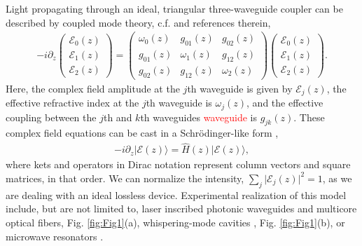 \documentclass[9pt,twocolumn,twoside]{osajnl}
\begin{document}
Light propagating through an ideal, triangular three-waveguide coupler can be described by coupled mode theory, c.f. \cite{RodriguezLara2015p068014} and references therein,
\begin{eqnarray} \label{eq:CMT}
-i \partial_{z} \left( \begin{array}{c} \mathcal{E}_{0}(z) \\ \mathcal{E}_{1}(z) \\  \mathcal{E}_{2}(z) \end{array} \right) =  \left( \begin{array}{ccc} 
\omega_{0}(z)  & g_{01}(z) & g_{02}(z) \\
g_{01}(z) & \omega_{1}(z) & g_{12}(z) \\
g_{02}(z) & g_{12}(z) & \omega_{2}(z)
\end{array} \right) \left( \begin{array}{c} \mathcal{E}_{0}(z) \\ \mathcal{E}_{1}(z) \\  \mathcal{E}_{2}(z) \end{array} \right).
\end{eqnarray}
Here, the complex field amplitude at the $j$th waveguide is given by $\mathcal{E}_{j}(z)$, the effective refractive index at the $j$th waveguide is $\omega_{j}(z)$, and the effective coupling between the $j$th and $k$th waveguides \textcolor{red}{waveguide} is $g_{jk}(z)$.
These complex field equations can be cast in a Schr\"odinger-like form \cite{RodriguezLara2015p068014},
\begin{eqnarray}
- i \partial_{z} \vert \mathcal{E}(z) \rangle = \hat{H}(z) \vert \mathcal{E}(z) \rangle,\label{eq:SchLike}
\end{eqnarray}
where kets and operators in Dirac notation represent column vectors and square matrices, in that order.
We can normalize the intensity, $\sum_{j} \vert \mathcal{E}_{j}(z) \vert^2 =1$, as we are dealing with an ideal lossless device.
Experimental realization of this model include, but are not limited to, laser inscribed photonic waveguides \cite{Szameit2010p163001} and  multicore optical fibers, Fig. \ref{fig:Fig1}(a), whispering-mode cavities \cite{Peng2014p394}, Fig. \ref{fig:Fig1}(b), or microwave resonators \cite{FrancoVillafane2013p170405}.
\end{document}
